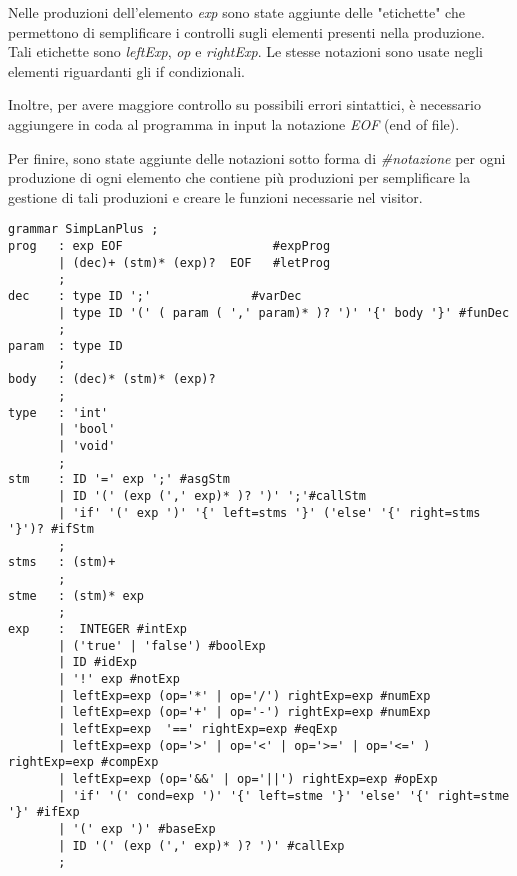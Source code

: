 Nelle produzioni dell'elemento \textit{exp} sono state aggiunte delle "etichette" che permettono di semplificare i controlli sugli elementi presenti nella produzione. Tali etichette sono \textit{leftExp}, \textit{op} e \textit{rightExp}. Le stesse notazioni sono usate negli elementi riguardanti gli if condizionali. 

Inoltre, per avere maggiore controllo su possibili errori sintattici, è necessario aggiungere in coda al programma in input la notazione \textit{EOF} (end of file).

Per finire, sono state aggiunte delle notazioni sotto forma di \textit{\#notazione} per ogni produzione di ogni elemento che contiene più produzioni per semplificare la gestione di tali produzioni e creare le funzioni necessarie nel visitor. 

%

\begin{verbatim}
grammar SimpLanPlus ;
prog   : exp EOF                     #expProg
       | (dec)+ (stm)* (exp)?  EOF   #letProg
       ;
dec    : type ID ';'              #varDec
       | type ID '(' ( param ( ',' param)* )? ')' '{' body '}' #funDec
       ;
param  : type ID
       ;
body   : (dec)* (stm)* (exp)?
	   ;
type   : 'int'
       | 'bool'
       | 'void'
       ;
stm    : ID '=' exp ';' #asgStm                                                                  
       | ID '(' (exp (',' exp)* )? ')' ';'#callStm
       | 'if' '(' exp ')' '{' left=stms '}' ('else' '{' right=stms '}')? #ifStm
	   ;
stms   : (stm)+
       ;
stme   : (stm)* exp
       ;
exp    :  INTEGER #intExp
       | ('true' | 'false') #boolExp
       | ID #idExp
       | '!' exp #notExp
       | leftExp=exp (op='*' | op='/') rightExp=exp #numExp
       | leftExp=exp (op='+' | op='-') rightExp=exp #numExp
       | leftExp=exp  '==' rightExp=exp #eqExp
       | leftExp=exp (op='>' | op='<' | op='>=' | op='<=' ) rightExp=exp #compExp
       | leftExp=exp (op='&&' | op='||') rightExp=exp #opExp
       | 'if' '(' cond=exp ')' '{' left=stme '}' 'else' '{' right=stme '}' #ifExp
       | '(' exp ')' #baseExp
       | ID '(' (exp (',' exp)* )? ')' #callExp
       ;

\end{verbatim}

